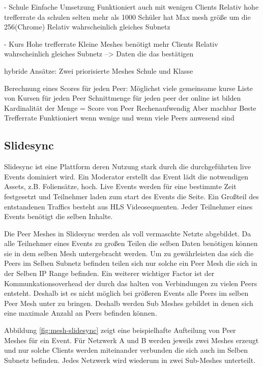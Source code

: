 - Schule
Einfache Umsetzung
Funktioniert auch mit wenigen Clients
Relativ hohe trefferrate da schulen selten mehr als 1000 Schüler hat
Max mesh größe um die 256(Chrome)
Relativ wahrscheinlich gleiches Subnetz

- Kurs
Hohe trefferrate
Kleine Meshes
benötigt mehr Clients
Relativ wahrscheinlich gleiches Subnetz --> Daten die das bestätigen

hybride Ansätze:
Zwei priorisierte Meshes Schule und Klasse

Berechnung eines Scores für jeden Peer:
Möglichst viele gemeinsame kurse
Liste von Kursen für jeden Peer
Schnittmenge für jeden peer der online ist bilden
Kardinalität der Menge = Score von Peer
Rechenaufwendig Aber machbar
Beste Trefferrate
Funktioniert wenn wenige und wenn viele Peers anwesend sind

\subsection{Slidesync}
Slidesync ist eine Plattform deren Nutzung stark durch die durchgeführten live Events dominiert wird. Ein Moderator erstellt das Event lädt die notwendigen Assets, z.B. Foliensätze, hoch. Live Events werden für eine bestimmte Zeit festgesetzt und Teilnehmer laden zum start des Events die Seite. Ein Großteil des entstandenen Traffics besteht aus HLS Videoseqmenten. Jeder Teilnehmer eines Events benötigt die selben Inhalte. 

Die Peer Meshes in Slidesync werden als voll vermaschte Netzte abgebildet. Da alle Teilnehmer eines Events zu großen Teilen die selben Daten benötigen können sie in dem selben Mesh untergebracht werden. Um zu gewährleisten das sich die Peers im Selben Subnetz befinden teilen sich nur solche ein Peer Mesh die sich in der Selben IP Range befinden. Ein weiterer wichtiger Factor ist der Kommunkationsoverhead der durch das halten von Verbindungen zu vielen Peers entsteht. Deshalb ist es nicht möglich bei größeren Events alle Peers im selben Peer Mesh unter zu bringen. Deshalb werden Sub Meshes gebildet in denen sich eine maximale Anzahl an Peers befinden können. 

Abbildung \ref{fig:mesh-slidesync} zeigt eine beispielhafte Aufteilung von Peer Meshes für ein Event. Für Netzwerk A und B werden jeweils zwei Meshes erzeugt und nur solche Clients werden miteinander verbunden die sich auch im Selben Subnetz befinden. Jedes Netzwerk wird wiederum in zwei Sub-Meshes unterteilt.

